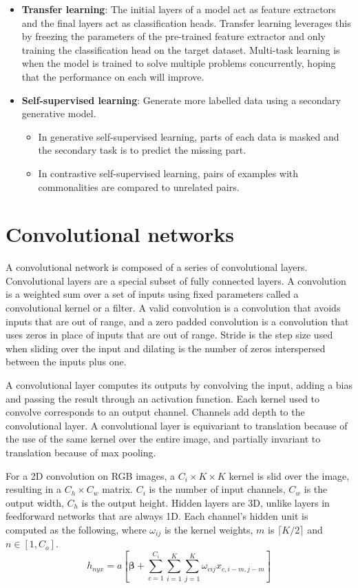 \documentclass{article}
\begin{document}
\begin{itemize}
\begin{itemize}
  \end{itemize}
  \item \textbf{Transfer learning}: The initial layers of a model act as feature extractors and the final layers act as classification heads. Transfer learning leverages this by freezing the parameters of the pre-trained feature extractor and only training the classification head on the target dataset. Multi-task learning is when the model is trained to solve multiple problems concurrently, hoping that the performance on each will improve.
  \item \textbf{Self-supervised learning}: Generate more labelled data using a secondary generative model.
  \begin{itemize}
    \item In generative self-supervised learning, parts of each data is masked and the secondary task is to predict the missing part.
    \item In contrastive self-supervised learning, pairs of examples with commonalities are compared to unrelated pairs.
  \end{itemize}
\end{itemize}

\section{Convolutional networks}
A convolutional network is composed of a series of convolutional layers. Convolutional layers are a special subset of fully connected layers. A convolution is a weighted sum over a set of inputs using fixed parameters called a convolutional kernel or a filter. A valid convolution is a convolution that avoids inputs that are out of range, and a zero padded convolution is a convolution that uses zeros in place of inputs that are out of range. Stride is the step size used when sliding over the input and dilating is the number of zeros interspersed between the inputs plus one.

A convolutional layer computes its outputs by convolving the input, adding a bias and passing the result through an activation function. Each kernel used to convolve corresponds to an output channel. Channels add depth to the convolutional layer. A convolutional layer is equivariant to translation because of the use of the same kernel over the entire image, and partially invariant to translation because of max pooling.

For a 2D convolution on RGB images, a $C_i \times K \times K$ kernel is slid over the image, resulting in a $C_{h} \times C_{w}$ matrix. $C_i$ is the number of input channels, $C_{w}$ is the output width, $C_{h}$ is the output height. Hidden layers are 3D, unlike layers in feedforward networks that are always 1D. Each channel's hidden unit is computed as the following, where $\omega_{ij}$ is the kernel weights, $m$ is $\lceil K/2 \rceil$ and $n \in [1, C_o]$.
  \[ h_{nyx} = a\left[\boldsymbol{\beta} + \sum_{c=1}^{C_i} \sum_{i=1}^{K} \sum_{j = 1}^{K} \omega_{cij} x_{c,i-m,j-m}\right] \]
\end{document}
